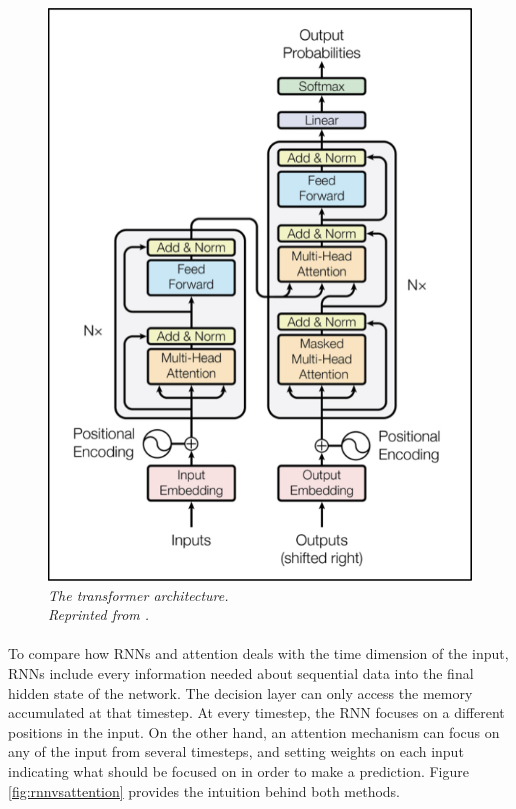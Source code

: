\begin{figure}[H]
  \centering
  \caption[The transformer architecture.]{\emph{The transformer architecture. \\Reprinted from \citeauthor{vaswani_shazeer_parmar_uszkoreit_jones_n_gomez_kaiser_polosukhin_2017} \citeyear{vaswani_shazeer_parmar_uszkoreit_jones_n_gomez_kaiser_polosukhin_2017}.}}\label{fig:attention}
  \includegraphics[scale = 0.4
  ]{figures/attention.jpg}  
\end{figure}

\paragraph{}
To compare how RNNs and attention deals with the time dimension of the input, RNNs include every information needed about sequential data into the final hidden state of the network. The decision layer can only access the memory accumulated at that timestep. At every timestep, the RNN focuses on a different positions in the input. On the other hand, an attention mechanism can focus on any of the input from several timesteps, and setting weights on each input indicating what should be focused on in order to make a prediction. Figure \ref{fig:rnnvsattention} provides the intuition behind both methods.

